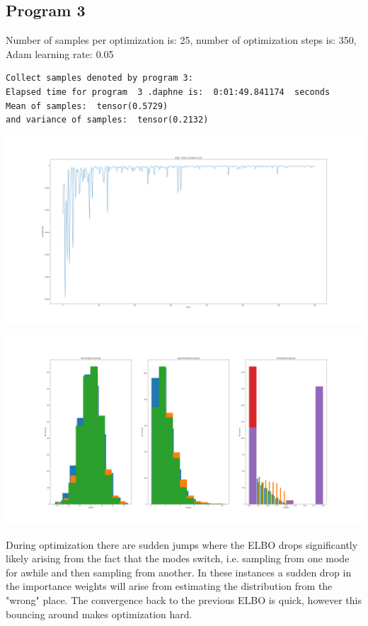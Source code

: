 \documentclass[]{article}
\begin{document}
\subsection{Program 3}
Number of samples per optimization is: 25, number of optimization steps is: 350, Adam learning rate: 0.05
\begin{verbatim}
Collect samples denoted by program 3:
Elapsed time for program  3 .daphne is:  0:01:49.841174  seconds
Mean of samples:  tensor(0.5729)
and variance of samples:  tensor(0.2132)
\end{verbatim}
\begin{center}
	\includegraphics[width=\linewidth]{Figures/elbo_3Adam3.png}
\end{center}
\begin{center}
	\includegraphics[width=\linewidth]{Figures/distEst3.png}
\end{center}
During optimization there are sudden jumps where the ELBO drops significantly likely arising from the fact that the modes switch, i.e. sampling from one mode for awhile and then sampling from another. In these instances a sudden drop in the importance weights will arise from estimating the distribution from the "wrong" place. The convergence back to the previous ELBO is quick, however this bouncing around makes optimization hard.
\end{document}
